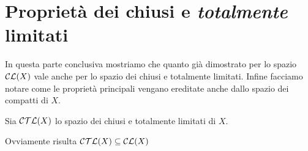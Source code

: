 \section{Proprietà dei chiusi e \emph{totalmente} limitati}
In questa parte conclusiva mostriamo che quanto già dimostrato per lo spazio $\mathcal{CL}(X)$ vale anche per lo spazio dei chiusi e totalmente limitati. Infine facciamo notare come le proprietà principali vengano ereditate anche dallo spazio dei compatti di $X$.

\begin{definition}
	Sia $\mathcal{CTL}(X)$ lo spazio dei chiusi e totalmente limitati di $X$.
\end{definition}
\begin{remark}
	Ovviamente risulta $\mathcal{CTL}(X)\subseteq \mathcal{CL}(X)$
\end{remark}

